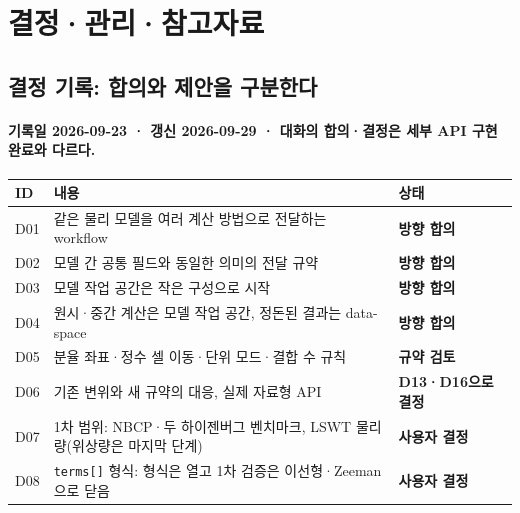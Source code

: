 
\section{결정·관리·참고자료}

\hypertarget{appendix-b}{}

\subsection{결정 기록: 합의와 제안을 구분한다}\label{decisions}
\begingroup%
  \framesubtitle{기록일 2026-09-23 · 갱신 2026-09-29 · 대화의 합의·결정은 세부 API 구현 완료와 다르다.}
  \small\renewcommand{\arraystretch}{1.12}
  \begin{tabularx}{\textwidth}{@{}p{0.7cm}YP{2.5cm}@{}}
    \toprule
    ID & 내용 & 상태 \\
    \midrule
    D01 & 같은 물리 모델을 여러 계산 방법으로 전달하는 workflow & \textbf{방향 합의} \\
    D02 & 모델 간 공통 필드와 동일한 의미의 전달 규약 & \textbf{방향 합의} \\
    D03 & 모델 작업 공간은 작은 구성으로 시작 & \textbf{방향 합의} \\
    D04 & 원시·중간 계산은 모델 작업 공간, 정돈된 결과는 data-space & \textbf{방향 합의} \\
    D05 & 분율 좌표·정수 셀 이동·단위 모드·결합 수 규칙 & \textbf{규약 검토} \\
    D06 & 기존 변위와 새 규약의 대응, 실제 자료형 API & \textbf{D13·D16으로 결정} \\
    D07 & 1차 범위: NBCP·두 하이젠버그 벤치마크, LSWT 물리량(위상량은 마지막 단계) & \textbf{사용자 결정} \\
    D08 & \texttt{terms[]} 형식: 형식은 열고 1차 검증은 이선형·Zeeman으로 닫음 & \textbf{사용자 결정} \\
\bottomrule
  \end{tabularx}
  \par\smallskip
\endgroup



